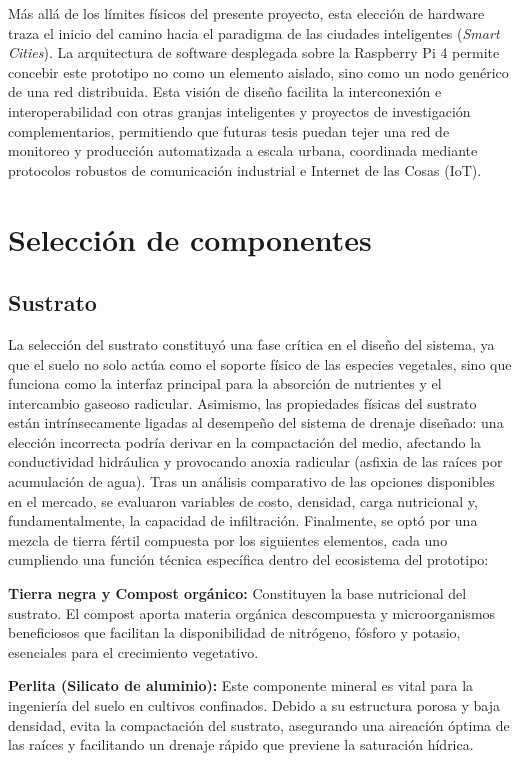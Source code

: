 Más allá de los límites físicos del presente proyecto, esta elección de hardware traza el inicio del camino hacia el paradigma de las ciudades inteligentes (\textit{Smart Cities}). La arquitectura de software desplegada sobre la Raspberry Pi 4 permite concebir este prototipo no como un elemento aislado, sino como un nodo genérico de una red distribuida. Esta visión de diseño facilita la interconexión e interoperabilidad con otras granjas inteligentes y proyectos de investigación complementarios, permitiendo que futuras tesis puedan tejer una red de monitoreo y producción automatizada a escala urbana, coordinada mediante protocolos robustos de comunicación industrial e Internet de las Cosas (IoT).
\section{Selección de componentes}

\subsection{Sustrato}
La selección del sustrato constituyó una fase crítica en el diseño del sistema, ya que el suelo no solo actúa como el soporte físico de las especies vegetales, sino que funciona como la interfaz principal para la absorción de nutrientes y el intercambio gaseoso radicular. Asimismo, las propiedades físicas del sustrato están intrínsecamente ligadas al desempeño del sistema de drenaje diseñado: una elección incorrecta podría derivar en la compactación del medio, afectando la conductividad hidráulica y provocando anoxia radicular (asfixia de las raíces por acumulación de agua).
Tras un análisis comparativo de las opciones disponibles en el mercado, se evaluaron variables de costo, densidad, carga nutricional y, fundamentalmente, la capacidad de infiltración. Finalmente, se optó por una mezcla de tierra fértil compuesta por los siguientes elementos, cada uno cumpliendo una función técnica específica dentro del ecosistema del prototipo:

\textbf{Tierra negra y Compost orgánico:} Constituyen la base nutricional del sustrato. El compost aporta materia orgánica descompuesta y microorganismos beneficiosos que facilitan la disponibilidad de nitrógeno, fósforo y potasio, esenciales para el crecimiento vegetativo.

\textbf{Perlita (Silicato de aluminio):} Este componente mineral es vital para la ingeniería del suelo en cultivos confinados. Debido a su estructura porosa y baja densidad, evita la compactación del sustrato, asegurando una aireación óptima de las raíces y facilitando un drenaje rápido que previene la saturación hídrica.

